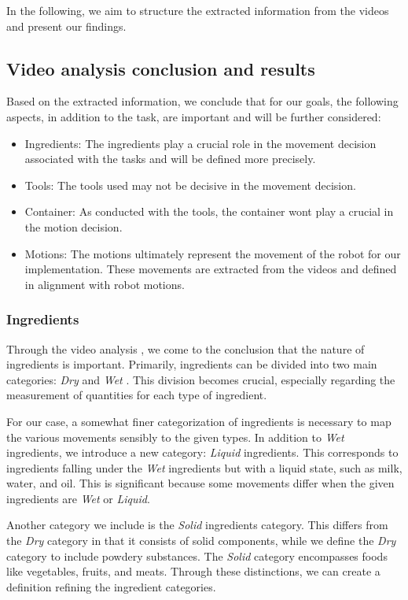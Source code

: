 In the following, we aim to structure the extracted information from the videos and present our findings.

\subsection{Video analysis conclusion and results}

Based on the extracted information, we conclude that for our goals, the following aspects, in addition to the task, are important and will be further considered:
\begin{itemize}
  \item Ingredients: The ingredients play a crucial role in the movement decision associated with the tasks and will be defined more precisely.
  \item Tools: The tools used may not be decisive in the movement decision.
  \item Container: As conducted with the tools, the container wont play a crucial in the motion decision.
  \item Motions: The motions ultimately represent the movement of the robot for our implementation. These movements are extracted from the videos and defined in alignment with robot motions.
\end{itemize}

\subsubsection{Ingredients}
Through the video analysis , we come to the conclusion that the nature of ingredients is important. 
Primarily, ingredients can be divided into two main categories: \textit{Dry} and \textit{Wet} \cite{Ohene2017}. This division becomes crucial, especially regarding the measurement of quantities for each type of ingredient.

For our case, a somewhat finer categorization of ingredients is necessary to map the various movements sensibly to the given types. In addition to \textit{Wet} ingredients, we introduce a new category: \textit{Liquid} ingredients. 
This corresponds to ingredients falling under the \textit{Wet} ingredients but with a liquid state, such as milk, water, and oil. This is significant because some movements differ when the given ingredients are \textit{Wet} or \textit{Liquid}.

Another category we include is the \textit{Solid} ingredients category. This differs from the \textit{Dry} category in that it consists of solid components, while we define the \textit{Dry} category to include powdery substances. The \textit{Solid} category encompasses foods like vegetables, fruits, and meats. Through these distinctions, we can create a definition refining the ingredient categories.

